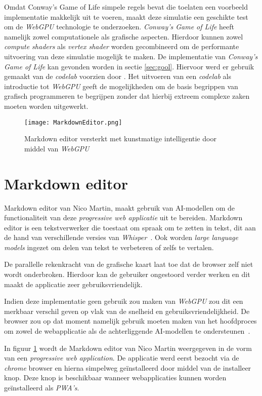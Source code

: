 Omdat Conway's Game of Life simpele regels bevat die toelaten een voorbeeld implementatie makkelijk uit te voeren, maakt deze simulatie een geschikte test om de \textit{WebGPU} technologie te onderzoeken. \textit{Conway's Game of Life} heeft namelijk zowel computationele als grafische aspecten. Hierdoor kunnen zowel \textit{compute shaders} als \textit{vertex shader} worden gecombineerd om de performante uitvoering van deze simulatie mogelijk te maken. De implementatie van \textit{Conway's Game of Life} kan gevonden worden in sectie \ref{sec:gool}. Hiervoor werd er gebruik gemaakt van de \textit{codelab} voorzien door \textcite{google2023}. Het uitvoeren van een \textit{codelab} als introductie tot \textit{WebGPU} geeft de mogelijkheden om de basis begrippen van grafisch programmeren te begrijpen zonder dat hierbij extreem complexe zaken moeten worden uitgewerkt.

\begin{figure}
    \texttt{[image: MarkdownEditor.png]}
    \caption[Markdown editor met AI en \textit{WebGPU}~\autocite{Martin2020}]{
        Markdown editor versterkt met kunstmatige intelligentie door middel van \textit{WebGPU}~\autocite{Martin2020}
    }
    \label{fig:MardownEditor}
\end{figure}

\section{Markdown editor}

Markdown editor van Nico Martin, maakt gebruik van AI-modellen om de functionaliteit van deze \textit{progressive web applicatie} uit te bereiden. Markdown editor is een tekstverwerker die toestaat om spraak om te zetten in tekst, dit aan de hand van verschillende versies van \textit{Whisper}~\autocite{radford2022whisper}. Ook worden \textit{large language models} ingezet om delen van tekst te verbeteren of zelfs te vertalen. 

\bigbreak{}

De parallelle rekenkracht van de grafische kaart laat toe dat de browser zelf niet wordt onderbroken. Hierdoor kan de gebruiker ongestoord verder werken en dit maakt de applicatie zeer gebruiksvriendelijk.

\bigbreak{}

Indien deze implementatie geen gebruik zou maken van \textit{WebGPU} zou dit een merkbaar verschil geven op vlak van de snelheid en gebruiksvriendelijkheid. De browser zou op dat moment namelijk gebruik moeten maken van het hoofdproces om  zowel de webapplicatie als de achterliggende AI-modellen te ondersteunen~\autocite{Martin2020}.

\bigbreak{}

In figuur \ref{fig:MardownEditor} wordt de Markdown editor van Nico Martin weergegeven in de vorm van een \textit{progressive web application}. De applicatie werd eerst bezocht via de \textit{chrome} browser en hierna simpelweg geïnstalleerd door middel van de installeer knop. Deze knop is beschikbaar wanneer webapplicaties kunnen worden geïnstalleerd als \textit{PWA's}.